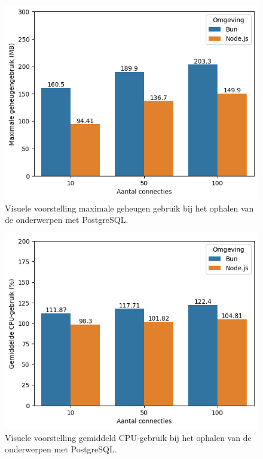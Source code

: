   \begin{figure}[H]
    \centering
    \includegraphics[width=0.7\columnwidth]{graphics/GetPostgresRAM.png}
    \caption[Geheugengebruik GET verzoek met PostgreSQL]{\label{fig:getgeheugenpostgres}Visuele voorstelling maximale geheugen gebruik bij het ophalen van de onderwerpen met PostgreSQL.}
  \end{figure}
  \begin{figure}[H]
    \centering
    \includegraphics[width=0.7\columnwidth]{graphics/GetPostgresCpu.png}
    \caption[CPU-gebruik GET verzoek met PostgreSQL]{\label{fig:getcpupostgres}Visuele voorstelling gemiddeld CPU-gebruik bij het ophalen van de onderwerpen met PostgreSQL.}
  \end{figure}

